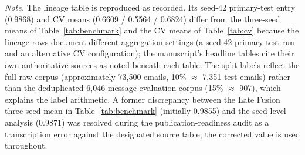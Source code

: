 \documentclass[10pt,twoside]{article}
\begin{document}
\begin{table}[h]
\centering
\caption{Results lineage (reproduced as recorded)}
\label{tab:lineage}
\scriptsize
\setlength{\tabcolsep}{3pt}
\end{table}

\noindent\emph{Note.} The lineage table is reproduced as recorded. Its seed-42 primary-test entry (0.9868) and CV means (0.6609 / 0.5564 / 0.6824) differ from the three-seed means of Table~\ref{tab:benchmark} and the CV means of Table~\ref{tab:cv} because the lineage rows document different aggregation settings (a seed-42 primary-test run and an alternative CV configuration); the manuscript's headline tables cite their own authoritative sources as noted beneath each table. The split labels reflect the full raw corpus (approximately 73,500 emails, 10\% $\approx$ 7,351 test emails) rather than the deduplicated 6,046-message evaluation corpus (15\% $\approx$ 907), which explains the label arithmetic. A former discrepancy between the Late Fusion three-seed mean in Table~\ref{tab:benchmark} (initially 0.9855) and the seed-level analysis (0.9871) was resolved during the publication-readiness audit as a transcription error against the designated source table; the corrected value is used throughout.



\end{document}
